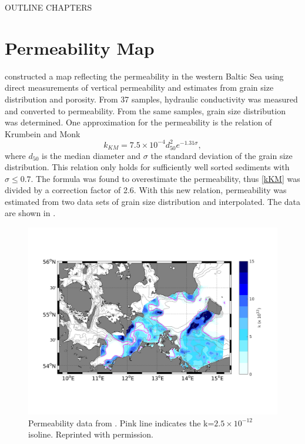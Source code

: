 OUTLINE CHAPTERS

\section{Permeability Map}

\cite{forster2003} constructed a map reflecting the permeability in the western 
Baltic Sea using direct measurements of vertical permeability and estimates 
from grain size distribution and porosity. From 37 samples, hydraulic 
conductivity was measured and converted to permeability. From the same samples, 
grain size distribution was determined. One approximation for the permeability 
is the relation of Krumbein and Monk \citep[][]{krumbein1942}
\begin{equation}
 \label{kKM}
 k_{KM} = 7.5 \times 10^{-4} d_{50}^2 e^{-1.31 \sigma},
\end{equation}
where $d_{50}$ is the median diameter and $\sigma$ the standard deviation of 
the grain size distribution. This relation only holds for sufficiently well 
sorted sediments with $\sigma \leq 0.7$. The formula was found to overestimate 
the permeability, thus \eqref{kKM} was divided by a correction factor of 2.6.  
With this new relation, permeability was estimated from two data sets of grain 
size distribution and interpolated. The data are shown in .
\begin{figure}[ht]
 \includegraphics[width=16cm]{bilder/perm_k.png}
 \caption{Permeability data from \cite{forster2003}. Pink line indicates the 
k=$2.5\times10^{-12}$ isoline. Reprinted with permission. \label{perm}}
\end{figure}

